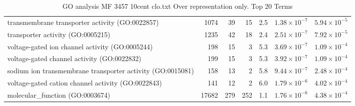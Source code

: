 \begin{table}[ht]
\begin{adjustbox}{width=\textwidth}
\begin{tabular}{lrrrrrr}
  transmembrane transporter activity (GO:0022857) & 1074 & 39 & 15 & 2.5 & $1.38 \times 10^{-7}$ & $5.94 \times 10^{-5}$ \\ 
  transporter activity (GO:0005215) & 1235 & 42 & 18 & 2.4 & $2.51 \times 10^{-7}$ & $7.92 \times 10^{-5}$ \\ 
  voltage-gated ion channel activity (GO:0005244) & 198 & 15 & 3 & 5.3 & $3.69 \times 10^{-7}$ & $1.09 \times 10^{-4}$ \\ 
  voltage-gated channel activity (GO:0022832) & 199 & 15 & 3 & 5.3 & $3.92 \times 10^{-7}$ & $1.09 \times 10^{-4}$ \\ 
  sodium ion transmembrane transporter activity (GO:0015081) & 158 & 13 & 2 & 5.8 & $9.44 \times 10^{-7}$ & $2.48 \times 10^{-4}$ \\ 
  voltage-gated cation channel activity (GO:0022843) & 141 & 12 & 2 & 6.0 & $1.79 \times 10^{-6}$ & $4.02 \times 10^{-4}$ \\ 
  molecular\_function (GO:0003674) & 17682 & 279 & 252 & 1.1 & $1.76 \times 10^{-6}$ & $4.38 \times 10^{-4}$ \\ 
   \hline
\end{tabular}
\end{adjustbox}
\caption{GO analysis MF 3457 10cent clo.txt Over representation only. Top 20 Terms} 
\label{tab:GO analysis MF 3457 10cent clo.txt Over representation only. Top 20 Terms}
\end{table}




